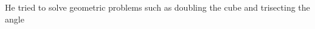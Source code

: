 \documentclass[preview]{standalone}
\begin{document}
\begin{center}
He tried to solve geometric problems such as doubling the cube and trisecting the angle
\end{center}
\end{document}
